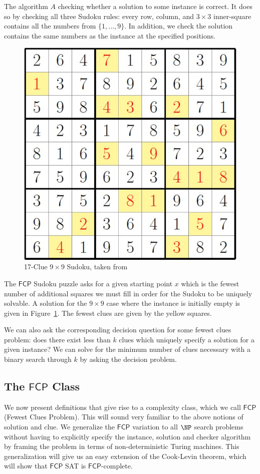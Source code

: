 \documentclass[runningheads,a4paper]{llncs}
\begin{document}
The algorithm $A$ checking whether a solution to some instance is correct. It does so by checking all three Sudoku rules: every row, column, and $3 \times 3$ inner-square contains all the numbers from $\{1 , ..., 9\}$. In addition, we check the solution contains the same numbers as the instance at the specified positions.

\begin{figure}
\centering
\label{fig:seventeencluesudoku}
\includegraphics[width=0.5\linewidth]{seventeencluesudoku.jpg}
\caption{17-Clue $9 \times 9$ Sudoku, taken from \cite{smallsudoku}}
\end{figure}

The $\mathsf{FCP}$ Sudoku puzzle asks for a given starting point $x$ which is the fewest number of additional squares we must fill in order for the Sudoku to be uniquely solvable. A solution for the $9 \times 9$ case where the instance is initially empty is given in Figure~\ref{fig:seventeencluesudoku}. The fewest clues are given by the yellow squares.

We can also ask the corresponding decision question for some fewest clues problem: does there exist less than $k$ clues which uniquely specify a solution for a given instance? We can solve for the minimum number of clues necessary with a binary search through $k$ by asking the decision problem.

\subsection{The $\mathsf{FCP}$ Class}

We now present definitions that give rise to a complexity class, which we call  $\mathsf{FCP}$ (Fewest Clues Problem). This will sound very familiar to the above notions of solution and clue. We generalize the $\mathsf{FCP}$ variation to all $\NP$ search problems without having to explicitly specify the instance, solution and checker algorithm by framing the problem in terms of non-deterministic Turing machines. This generalization will give us an easy extension of the Cook-Levin theorem, which will show that $\mathsf{FCP}$ SAT is $\mathsf{FCP}$-complete. 
\end{document}

